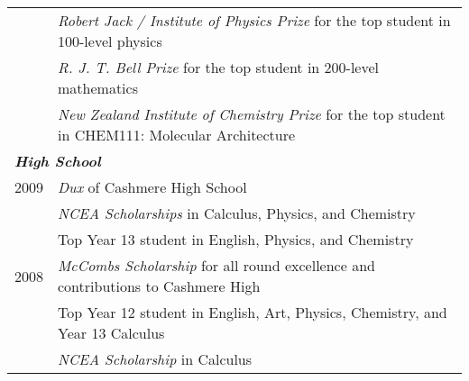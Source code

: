 \documentclass[10pt,a4paper,final]{article}
\begin{document}
\begin{table}[h!]
\begin{tabularx}{\textwidth}{l m{}}
       & \textit{Robert Jack / Institute of Physics Prize} for the top student in 100-level physics\\
       & \textit{R. J. T. Bell Prize} for the top student in 200-level mathematics\\
       & \textit{New Zealand Institute of Chemistry Prize} for the top student in CHEM111: Molecular Architecture \\
\multicolumn{2}{l}{\textbf{\textit{High School}}} \\
{2009} & \textit{Dux} of Cashmere High School\\
& \textit{NCEA Scholarships} in Calculus, Physics, and Chemistry\\
& Top Year 13 student in English, Physics, and Chemistry\\
{2008} & \textit{McCombs Scholarship} for all round excellence and contributions to Cashmere High\\
& Top Year 12 student in English, Art, Physics, Chemistry, and Year 13 Calculus\\
& \textit{NCEA Scholarship} in Calculus
\end{tabularx}
\end{table}
\end{document}
